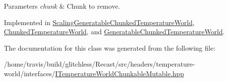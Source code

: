 \begin{DoxyParams}{Parameters}
{\em chunk} & Chunk to remove. \\
\hline
\end{DoxyParams}


Implemented in \hyperlink{class_scaling_generatable_chunked_temperature_world_ac3ae4d696d934b925076eeab88658978}{Scaling\-Generatable\-Chunked\-Temperature\-World}, \hyperlink{class_chunked_temperature_world_a623c1f5efe7aa84d428ba58365ee775a}{Chunked\-Temperature\-World}, and \hyperlink{class_generatable_chunked_temperature_world_a42c646343bb79dcdeb9f96e6aa06cbec}{Generatable\-Chunked\-Temperature\-World}.



The documentation for this class was generated from the following file\-:\begin{DoxyCompactItemize}
\item 
/home/travis/build/glitchless/\-Recast/src/headers/temperature-\/world/interfaces/\hyperlink{_i_temperature_world_chunkable_mutable_8hpp}{I\-Temperature\-World\-Chunkable\-Mutable.\-hpp}\end{DoxyCompactItemize}
